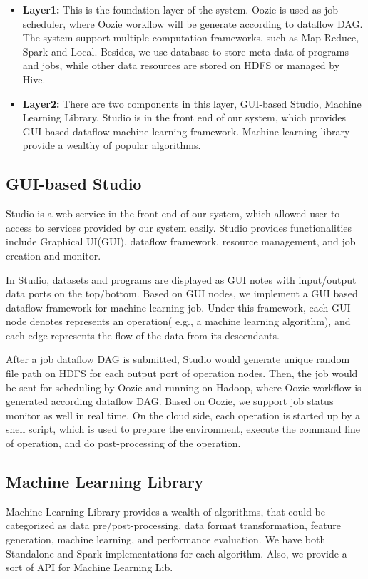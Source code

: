 \documentclass{sig-alternate-05-2015}
\begin{document}
\begin{itemize}
\item \textbf{Layer1:} This is the foundation layer of the system. Oozie is used as job scheduler, where Oozie workflow will be generate according to dataflow DAG. The system support multiple computation frameworks, such as Map-Reduce, Spark and Local. Besides, we use database to store meta data of programs and jobs, while other data resources are stored on HDFS or managed by Hive.
\item \textbf{Layer2:} There are two components in this layer, GUI-based Studio, Machine Learning Library. Studio is in the front end of our system, which provides GUI based dataflow machine learning framework. Machine learning library provide a wealthy of popular algorithms.
\end{itemize}


\subsection{GUI-based Studio}
Studio is a web service in the front end of our system, which allowed user to access to services provided by our system easily. Studio provides functionalities include Graphical UI(GUI), dataflow framework, resource management, and job creation and monitor.

In Studio, datasets and programs are displayed as GUI notes with input/output data ports on the top/bottom. Based on GUI nodes, we implement a GUI based dataflow framework for machine learning job. Under this framework, each GUI node denotes represents an operation( e.g., a machine learning algorithm), and each edge represents the flow of the data from its descendants. 

After a job dataflow DAG is submitted, Studio would generate unique random file path on HDFS for each output port of operation nodes. Then, the job would be sent for scheduling by Oozie and running on Hadoop, where Oozie workflow is generated according dataflow DAG. Based on Oozie, we support job status monitor as well in real time. On the cloud side, each operation is started up by a shell script, which is used to prepare the environment, execute the command line of operation, and do post-processing of the operation.

\subsection{Machine Learning Library}
Machine Learning Library provides a wealth of algorithms, that could be categorized as data pre/post-processing, data format transformation, feature generation, machine learning, and performance evaluation. We have both Standalone and Spark implementations for each algorithm. Also, we provide a sort of API for Machine Learning Lib. 
\end{document}
